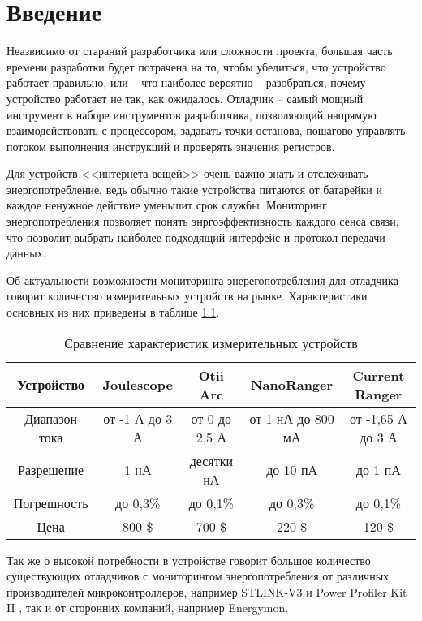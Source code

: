 
\chapter{Введение}
\hspace{1cm} Неазвисимо от стараний разработчика или сложности проекта, большая часть времени разработки
будет потрачена на то, чтобы убедиться, что устройство работает правильно, или -- что наиболее
вероятно -- разобраться, почему устройство работает не так, как ожидалось. Отладчик -- самый мощный 
инструмент в наборе инструментов разработчика, позволяющий напрямую взаимодействовать с процессором,
задавать точки останова, пошагово управлять потоком выполнения инструкций и проверять  значения
регистров. \cite{Lakamera:embed}

Для устройств <<интернета вещей>> очень важно знать и отслеживать энергопотребление,
ведь обычно такие устройства питаются от батарейки и каждое ненужное действие уменьшит
срок службы. Мониторинг энергопотребления позволяет понять энргоэффективность каждого сенса связи,
что позволит выбрать наиболее подходящий интерфейс и протокол передачи данных.

Об актуальности возможности мониторинга энерегопотребления для отладчика говорит количество 
измерительных устройств на рынке. Характеристики основных из них приведены в таблице 
\ref{comparemeasdevices}.

\begin{table}[H]
    \caption{Сравнение характеристик измерительных устройств}
    \label{comparemeasdevices}   
    \begin{center}
    \begin{tabular}{|c|c|c|c|c|}
    \hline
  Устройство & Joulescope & Otii Arc & NanoRanger & Current Ranger \\ \hline
    Диапазон тока & от -1 А до 3 А & от 0 до 2,5 А & от 1 нА до 800 мА & от -1,65 А до 3 А \\ \hline
    Разрешение & 1 нА & десятки нА & до 10 пА & до 1 пА  \\ \hline
    Погрешность & до 0,3\% & до 0,1\% & до 0,3\% & до 0,1\% \\ \hline
    Цена & 800 \$ & 700 \$ & 220 \$ & 120 \$  \\ \hline
    \end{tabular}
    \end{center}
\end{table} 

Так же о высокой потребности в устройстве говорит большое количество существующих отладчиков с 
мониторингом энергопотребления от различных производителей микроконтроллеров, например STLINK-V3 
\cite{STLINKV3} и Power Profiler Kit II \cite{Power Profiler Kit}, так и от сторонних компаний, например 
Energymon.

